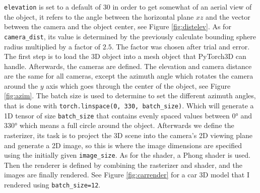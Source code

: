 \documentclass[a4paper,11pt,oneside]{article}
\begin{document}
\verb|elevation| is set to a default of 30 in order to get somewhat of an aerial view of the object, it refers to the angle between the horizontal plane $xz$ and the vector between the camera and the object center, see Figure \ref{fig:distelev}. As for \verb|camera_dist|, its value is determined by the previously calculate bounding sphere radius multiplied by a factor of $2.5$. The factor was chosen after trial and error. The first step is to load the 3D object into a mesh object that PyTorch3D can handle. Afterwards, the cameras are defined. The elevation and camera distance are the same for all cameras, except the azimuth angle which rotates the camera around the $y$ axis which goes through the center of the object, see Figure \ref{fig:azim}. The batch size is used to determine to set the different azimuth angles, that is done with \verb|torch.linspace(0, 330, batch_size)|. Which will generate a 1D tensor of size \texttt{batch\_size} that contains evenly spaced values between \ang{0} and \ang{330} which means a full circle around the object. Afterwards we define the rasterizer, its task is to project the 3D scene into the camera's 2D viewing plane and generate a 2D image, so this is where the image dimensions are specified using the initially given \texttt{image\_size}. As for the shader, a Phong shader \cite{phong} is used. Then the renderer is defined by combining the rasterizer and shader, and the images are finally rendered. See Figure \ref{fig:carrender} for a car 3D model that I rendered using \verb|batch_size=12|.
\end{document}
